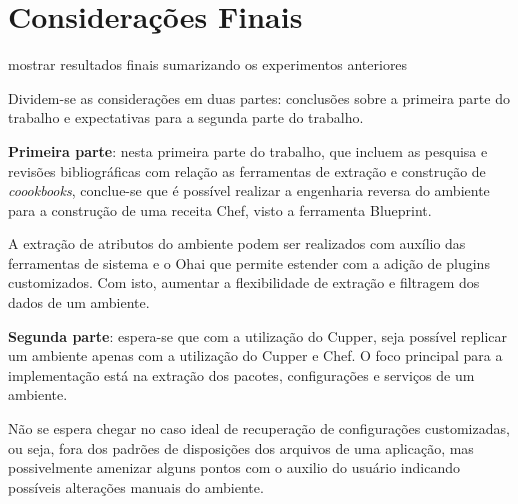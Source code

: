 \newpage\null\thispagestyle{empty}\newpage
\chapter{Considerações Finais}
\label{chap:result-parc}

{\color{red} mostrar resultados finais sumarizando os experimentos anteriores}

Dividem-se as considerações em duas partes: conclusões
sobre a primeira parte do trabalho e expectativas para
a segunda parte do trabalho.

\textbf{Primeira parte}: nesta primeira parte do trabalho, que
incluem as pesquisa e revisões bibliográficas com relação
as ferramentas de extração e construção de \textit{coookbooks},
conclue-se que é possível realizar a engenharia reversa do
ambiente para a construção de uma receita Chef, visto a
ferramenta Blueprint.

A extração de atributos do ambiente podem ser realizados
com auxílio das ferramentas de sistema e o Ohai que permite
estender com a adição de plugins customizados. Com isto,
aumentar a flexibilidade de extração e filtragem dos dados
de um ambiente.

\textbf{Segunda parte}: espera-se que com a utilização do Cupper,
seja possível replicar um ambiente apenas com a utilização
do Cupper e Chef. O foco principal para a implementação
está na extração dos pacotes, configurações e serviços
de um ambiente.

Não se espera chegar no caso ideal de
recuperação de configurações customizadas, ou seja, fora
dos padrões de disposições dos arquivos de uma aplicação,
mas possivelmente amenizar alguns pontos com o auxilio do
usuário indicando possíveis alterações manuais do ambiente.



